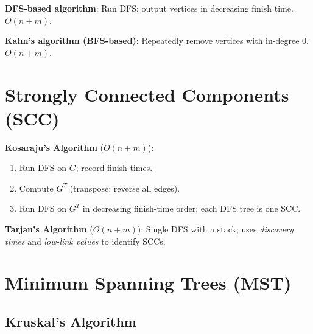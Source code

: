 \documentclass[oneside]{book}
\begin{document}
\textbf{DFS-based algorithm}: Run DFS; output vertices in decreasing finish time.
$O(n + m)$.

\textbf{Kahn's algorithm (BFS-based)}: Repeatedly remove vertices with in-degree 0.
$O(n + m)$.


\section{Strongly Connected Components (SCC)}


\textbf{Kosaraju's Algorithm} ($O(n + m)$):
\begin{enumerate}
    \item Run DFS on $G$; record finish times.
    \item Compute $G^T$ (transpose: reverse all edges).
    \item Run DFS on $G^T$ in decreasing finish-time order; each DFS tree is one SCC.
\end{enumerate}

\textbf{Tarjan's Algorithm} ($O(n + m)$): Single DFS with a stack; uses
\emph{discovery times} and \emph{low-link values} to identify SCCs.

\section{Minimum Spanning Trees (MST)}


\subsection*{Kruskal's Algorithm}
\end{document}
